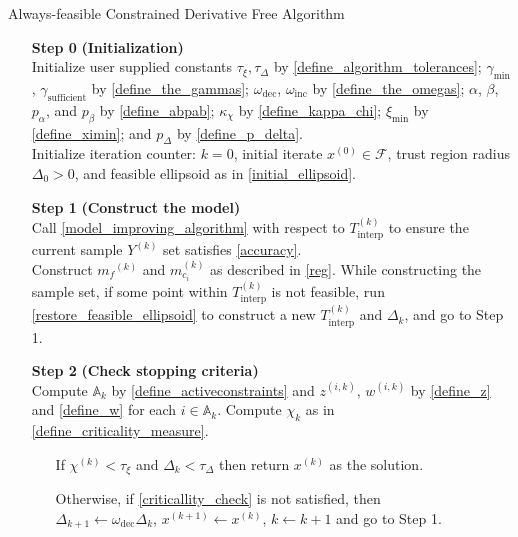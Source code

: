 \documentclass{article}
\theoremstyle{case}
\numberwithin{theorem}{subsection}
\newcommand{\activeconstraintsk}{{\mathbb A_{k}}}
\newcommand{\chik}{{\chi^{(k)}}}
\newcommand{\dk}{\Delta_k}
\newcommand{\feasible}{{\mathcal F}}
\newcommand{\gammabi}{\gamma_{\textrm{sufficient}}}
\newcommand{\gammasm}{\gamma_{\textrm{min}}}
\newcommand{\mcik}{{{m}^{(k)}_{c_i}}}
\newcommand{\mfk}{{{m}_f}^{(k)}}
\newcommand{\omegadec}{\omega_{\text{dec}}}
\newcommand{\omegainc}{\omega_{\text{inc}}}
\newcommand{\sampletrk}{{T_{\text{interp}}^{(k)}}}
\newcommand{\tolcrit}{\tau_{\xi}}
\newcommand{\tolrad}{\tau_{\Delta}}
\newcommand{\wik}{{w^{(i, k)}}}
\newcommand{\ximin}{\xi_{\text{min}}}
\newcommand{\xk}{{x^{(k)}}}
\newcommand{\zik}{{z^{(i, k)}}}
\begin{document}
\begin{algorithm}[H]
    \caption{Always-feasible Constrained Derivative Free Algorithm}	
    \label{constrained_dfo}
    \begin{itemize}
        \item[\textbf{Step 0}] \textbf{(Initialization)} \\
        	Initialize user supplied constants $\tolcrit, \tolrad$ by \cref{define_algorithm_tolerances};
        	$\gammasm$, $\gammabi$ by \cref{define_the_gammas};
        	$\omegadec$, $\omegainc$ by \cref{define_the_omegas};
        	$\alpha$, $\beta$, $p_{\alpha}$, and $p_{\beta}$ by \cref{define_abpab};
			$\kappa_{\chi}$ by \cref{define_kappa_chi};
			$\ximin$ by \cref{define_ximin};
			and $p_{\Delta}$ by \cref{define_p_delta}. \\
        	Initialize iteration counter: $k=0$, initial iterate $x^{(0)} \in \feasible$, trust region radius $\Delta_0 > 0$, and feasible ellipsoid as in \cref{initial_ellipsoid}.
            
        \item[\textbf{Step 1}] \textbf{(Construct the model)} \\
        Call \cref{model_improving_algorithm} with respect to $\sampletrk$ to ensure the current sample $Y^{(k)}$ set satisfies \cref{accuracy}. \\
        Construct $\mfk$ and $\mcik$ as described in \cref{reg}.
        While constructing the sample set, if some point within $\sampletrk$ is not feasible, 
        run \cref{restore_feasible_ellipsoid} to construct a new $\sampletrk$ and $\dk$, and go to Step 1.
        
        \item[\textbf{Step 2}] \textbf{(Check stopping criteria)} \\
        	Compute $\activeconstraintsk$ by \cref{define_activeconstraints} and $\zik$, $\wik$ by \cref{define_z} and \cref{define_w} for each $i \in \activeconstraintsk$.
            Compute $\chi_k$ as in \cref{define_criticality_measure}. \begin{itemize}
                \item[] If $ \chik < \tau_{\xi} $ and $\dk <\tau_{\Delta}$ then return $\xk$ as the solution.
                \item[] Otherwise, if \cref{criticallity_check} is not satisfied, then \\
                $\Delta_{k+1} \gets \omegadec\dk$, 
                $x^{(k+1)} \gets \xk$,
                $k \gets k+1$ and go to Step 1.
            \end{itemize}
            

\end{itemize}
\end{algorithm}
\end{document}
